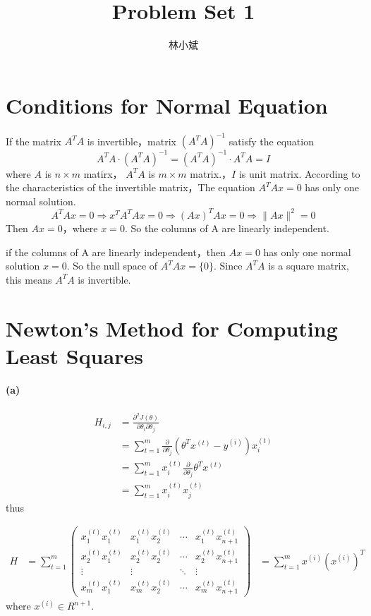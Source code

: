 \documentclass[UTF8]{article}
\author {林小斌}
\title {Problem Set 1}
\begin{document}
\maketitle
\section{Conditions for Normal Equation}
\quad If the matrix $A^TA$ is invertible，matrix $(A^TA)^{-1}$ satisfy the equation
$$
A^TA \cdot (A^TA)^{-1} =  (A^TA)^{-1} \cdot A^TA = I
$$
where $A$ is $n \times m$ matirx， $A^TA$ is $m \times m$ matrix.，$I$ is unit matrix.
According to the characteristics of the invertible matrix，The equation $A^TAx= 0$ has only one normal solution.
$$
A^TAx = 0  \Longrightarrow  x^TA^TAx = 0 \Longrightarrow (Ax)^TAx =0 \Longrightarrow \|  Ax \|^2 =0
$$
Then $Ax = 0$，where $x = 0$. So the columns of A are linearly independent.

\quad if the columns of A are linearly independent，then $Ax = 0$ has only one normal solution $x = 0$.   So the null space of $A^TAx=\{0\}$. Since $A^TA$ is a square matrix, this means $A^TA$ is invertible.

\section{Newton's Method for Computing Least Squares}
\paragraph{(a)}
\begin{align*}
H_{i,j} &= \frac{\partial^2J(\theta)}{\partial \theta_i \partial \theta_j} \\
&=  \sum_{t=1}^m \frac{\partial}{\partial \theta_j} (\theta^Tx^{(t)}-y^{(i)})x_i^{(t)} \\
&=  \sum_{t=1}^m x_i^{(t)} \frac{\partial}{\partial \theta_j} \theta^Tx^{(t)} \\
&= \sum_{t=1}^m x_i^{(t)}x_j^{(t)}
\end{align*}
thus

\begin{align*}
H &= \sum_{t=1}^m
\begin{pmatrix}
        x_1^{(t)}x_1^{(t)} &  x_1^{(t)}x_2^{(t)} & \cdots &  x_1^{(t)}x_{n+1}^{(t)} \\
        x_2^{(t)}x_1^{(t)} &  x_2^{(t)}x_2^{(t)} &  \cdots &  x_2^{(t)}x_{n+1}^{(t)} \\
       \vdots & \vdots  & \ddots & \vdots \\
        x_m^{(t)}x_1^{(t)} &  x_m^{(t)}x_2^{(t)} & \cdots &  x_m^{(t)}x_{n+1}^{(t)}
\end{pmatrix}
& = \sum_{t=1}^m x^{(i)}(x^{(i)})^T \tag{$2.1$}
\end{align*}
where $x^{(i)} \in R^{n+1}$.
\end{document}
